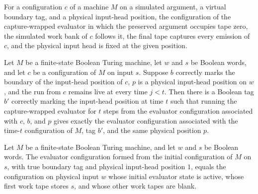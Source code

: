 \begin{definition}
\label{Turing.FinTM.emCallEvalCfg}
\leanok
{}
For a configuration $c$ of a machine $M$ on a simulated argument, a virtual boundary
tag, and a physical input-head position, the configuration of the capture-wrapped
evaluator in which the preserved argument occupies tape zero, the simulated work bank of
$c$ follows it, the final tape captures every emission of $c$, and the physical input
head is fixed at the given position.
\end{definition}

\begin{lemma}
\label{Turing.FinTM.emCall_eval_run}
\leanok
{}
Let $M$ be a finite-state Boolean Turing machine, let $w$ and $s$ be Boolean words, and
let $c$ be a configuration of $M$ on input $s$. Suppose $b$ correctly marks the boundary
of the input-head position of $c$, $p$ is a physical input-head position on $w$, and the
run from $c$ remains live at every time $j<t$. Then there is a Boolean tag $b'$
correctly marking the input-head position at time $t$ such that running the
capture-wrapped evaluator for $t$ steps from the evaluator configuration associated with
$c$, $b$, and $p$ gives exactly the evaluator configuration associated with the time-$t$
configuration of $M$, tag $b'$, and the same physical position $p$.
\end{lemma}

\begin{lemma}
\label{Turing.FinTM.emCall_eval_initial}
\leanok
{}
Let $M$ be a finite-state Boolean Turing machine, and let $w$ and $s$ be Boolean words.
The evaluator configuration formed from the initial configuration of $M$ on $s$, with
true boundary tag and physical input-head position $1$, equals the configuration on
physical input $w$ whose initial evaluator state is active, whose first work tape stores
$s$, and whose other work tapes are blank.
\end{lemma}

